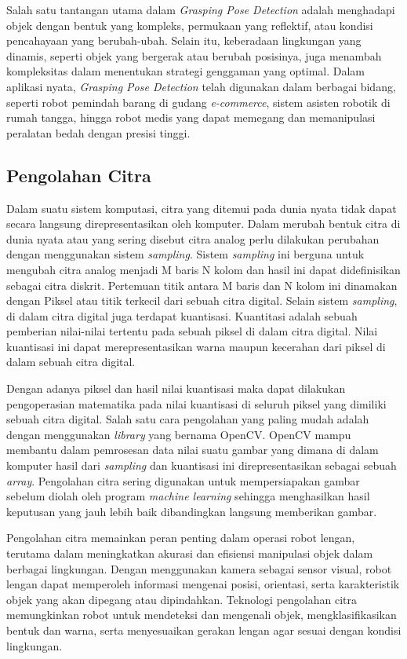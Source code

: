 Salah satu tantangan utama dalam \emph{Grasping Pose Detection} adalah menghadapi objek dengan bentuk yang kompleks,
permukaan yang reflektif, atau kondisi pencahayaan yang berubah-ubah. Selain itu, keberadaan lingkungan yang dinamis,
seperti objek yang bergerak atau berubah posisinya, juga menambah kompleksitas dalam menentukan strategi genggaman
yang optimal.
Dalam aplikasi nyata, \emph{Grasping Pose Detection} telah digunakan dalam berbagai bidang,
seperti robot pemindah barang di gudang \emph{e-commerce}, sistem asisten robotik di rumah tangga,
hingga robot medis yang dapat memegang dan memanipulasi peralatan bedah dengan presisi tinggi.

\subsection{Pengolahan Citra}
Dalam suatu sistem komputasi, citra yang ditemui pada dunia nyata tidak dapat secara
langsung direpresentasikan oleh komputer. Dalam merubah bentuk citra di dunia nyata atau
yang sering disebut citra analog perlu dilakukan perubahan dengan menggunakan sistem \emph{sampling}.
Sistem \emph{sampling} ini berguna untuk mengubah citra analog menjadi M baris N kolom dan
hasil ini dapat didefinisikan sebagai citra diskrit. Pertemuan titik antara M baris dan N kolom
ini dinamakan dengan Piksel atau titik terkecil dari sebuah citra digital. Selain sistem \emph{sampling},
di dalam citra digital juga terdapat kuantisasi. Kuantitasi adalah sebuah pemberian nilai-nilai
tertentu pada sebuah piksel di dalam citra digital. Nilai kuantisasi ini dapat merepresentasikan
warna maupun kecerahan dari piksel di dalam sebuah citra digital.

Dengan adanya piksel dan hasil nilai kuantisasi maka dapat dilakukan pengoperasian matematika pada nilai kuantisasi
di seluruh piksel yang dimiliki sebuah citra digital. Salah satu cara pengolahan yang paling mudah adalah dengan
menggunakan \emph{library} yang bernama OpenCV\parencite{RDKusumanto_pcdumompwmnr}. OpenCV mampu membantu dalam pemrosesan
data nilai suatu gambar yang dimana di dalam komputer hasil dari \emph{sampling} dan kuantisasi ini direpresentasikan
sebagai sebuah \emph{array}. Pengolahan citra sering digunakan untuk mempersiapakan gambar sebelum diolah oleh program
\emph{machine learning} sehingga menghasilkan hasil keputusan yang jauh lebih baik dibandingkan langsung memberikan gambar.

Pengolahan citra memainkan peran penting dalam operasi robot lengan, terutama dalam meningkatkan akurasi
dan efisiensi manipulasi objek dalam berbagai lingkungan. Dengan menggunakan kamera sebagai sensor visual, robot lengan
dapat memperoleh informasi mengenai posisi, orientasi, serta karakteristik objek yang akan dipegang atau dipindahkan.
Teknologi pengolahan citra memungkinkan robot untuk mendeteksi dan mengenali objek, mengklasifikasikan bentuk dan warna,
serta menyesuaikan gerakan lengan agar sesuai dengan kondisi lingkungan.

